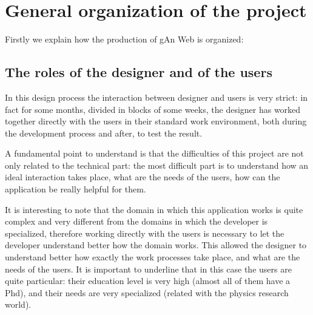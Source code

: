 
\chapter{General organization of the project} %

\label{Chapter3} %


Firstly we explain how the production of gAn Web is organized:

\section{The roles of the designer and of the users}
In this design process the interaction between designer and users is very strict: in fact for some months, divided in blocks of some weeks, the designer has worked together directly with the users in their standard work environment, both during the development process and after, to test the result. 

A fundamental point to understand is that the difficulties of this project are not only related to the technical part: the most difficult part is to understand how an ideal interaction takes place, what are the needs of the users, how can the application be really helpful for them.
 
It is interesting to note that the domain in which this application works is quite complex and very different from the domains in which the developer is specialized, therefore working directly with the users is necessary to let the developer understand better how the domain works.
This allowed the designer to understand better how exactly the work processes take place, and what are the needs of the users. 
It is important to underline that in this case the users are quite particular: their education level is very high (almost all of them have a Phd), and their needs are very specialized (related with the physics research world).

